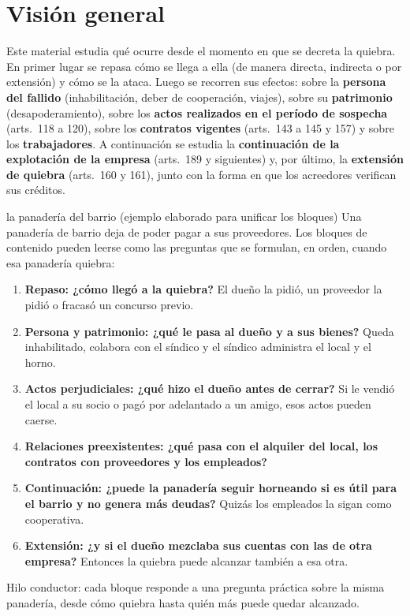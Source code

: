 \documentclass[12pt,oneside]{book}
\begin{document}

\chapter*{Visión general}

Este material estudia qué ocurre desde el momento en que se decreta la quiebra. En primer lugar se repasa cómo se llega a ella (de manera directa, indirecta o por extensión) y cómo se la ataca. Luego se recorren sus efectos: sobre la \textbf{persona del fallido} (inhabilitación, deber de cooperación, viajes), sobre su \textbf{patrimonio} (desapoderamiento), sobre los \textbf{actos realizados en el período de sospecha} (arts.~118 a 120), sobre los \textbf{contratos vigentes} (arts.~143 a 145 y 157) y sobre los \textbf{trabajadores}. A continuación se estudia la \textbf{continuación de la explotación de la empresa} (arts.~189 y siguientes) y, por último, la \textbf{extensión de quiebra} (arts.~160 y 161), junto con la forma en que los acreedores verifican sus créditos.

\begin{example}{la panadería del barrio (ejemplo elaborado para unificar los bloques)}
Una panadería de barrio deja de poder pagar a sus proveedores. Los bloques de contenido pueden leerse como las preguntas que se formulan, en orden, cuando esa panadería quiebra:
\begin{enumerate}
    \item \textbf{Repaso: ¿cómo llegó a la quiebra?} El dueño la pidió, un proveedor la pidió o fracasó un concurso previo.
    \item \textbf{Persona y patrimonio: ¿qué le pasa al dueño y a sus bienes?} Queda inhabilitado, colabora con el síndico y el síndico administra el local y el horno.
    \item \textbf{Actos perjudiciales: ¿qué hizo el dueño antes de cerrar?} Si le vendió el local a su socio o pagó por adelantado a un amigo, esos actos pueden caerse.
    \item \textbf{Relaciones preexistentes: ¿qué pasa con el alquiler del local, los contratos con proveedores y los empleados?}
    \item \textbf{Continuación: ¿puede la panadería seguir horneando si es útil para el barrio y no genera más deudas?} Quizás los empleados la sigan como cooperativa.
    \item \textbf{Extensión: ¿y si el dueño mezclaba sus cuentas con las de otra empresa?} Entonces la quiebra puede alcanzar también a esa otra.
\end{enumerate}
Hilo conductor: cada bloque responde a una pregunta práctica sobre la misma panadería, desde cómo quiebra hasta quién más puede quedar alcanzado.
\end{example}
\end{document}
